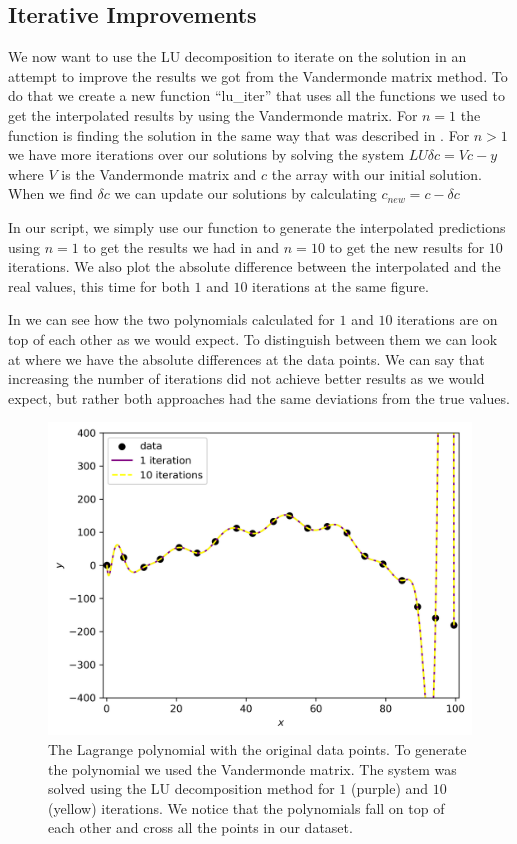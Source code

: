 \documentclass[a4paper,10pt]{article}
\begin{document}
\subsection{Iterative Improvements}
\label{chap:lu_iter}



We now want to use the LU decomposition to iterate on the solution in an attempt to improve the results we got from the Vandermonde matrix method. To do that we create a new function ``lu\_iter'' that uses all the functions we used to get the interpolated results by using the Vandermonde matrix. For $n=1$ the function is finding the solution in the same way that was described in . For $n>1$ we have more iterations over our solutions by solving the system $L U \delta c = V c - y $ where $V$ is the Vandermonde matrix and $c$ the array with our initial solution. When we find $\delta c$ we can update our solutions by calculating $c_{new}=c - \delta c$

In our script, we simply use our function to generate the interpolated predictions using $n=1$ to get the results we had in  and $n=10$ to get the new results for $10$ iterations. We also plot the absolute difference between the interpolated and the real values, this time for both $1$ and $10$ iterations at the same figure. 

In  we can see how the two polynomials calculated for $1$ and $10$ iterations are on top of each other as we would expect. To distinguish between them we can look at  where we have the absolute differences at the data points. We can say that increasing the number of iterations did not achieve better results as we would expect, but rather both approaches had the same deviations from the true values. 

\begin{figure}[H]
  \centering
  \includegraphics[width=0.75\linewidth]{./plots/iter_comp.png}
  \caption{The Lagrange polynomial with the original data points. To generate the polynomial we used the Vandermonde matrix. The system was solved using the LU decomposition method for $1$ (purple) and $10$ (yellow) iterations. We notice that the polynomials fall on top of each other and cross all the points in our dataset.}
  \label{fig:iter_pol}
\end{figure}
\end{document}
